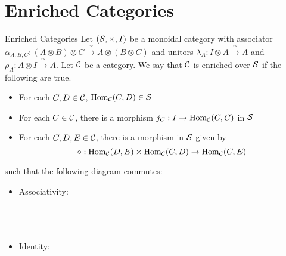 \documentclass[a4paper]{article}
\begin{document}
\section{Enriched Categories}
\begin{defn}{Enriched Categories}{} Let $(\mathcal{S},\times,I)$ be a monoidal category with associator $\alpha_{A,B,C}:(A\otimes B)\otimes C\overset{\cong}{\rightarrow}A\otimes (B\otimes C)$ and unitors $\lambda_A:I\otimes A\overset{\cong}{\rightarrow}A$ and $
\rho_A:A\otimes I\overset{\cong}{\rightarrow}A$. Let $\mathcal{C}$ be a category. We say that $\mathcal{C}$ is enriched over $\mathcal{S}$ if the following are true. 
\begin{itemize}
\item For each $C,D\in\mathcal{C}$, $\operatorname{Hom}_{\mathcal{C}}(C,D)\in\mathcal{S}$
\item For each $C\in\mathcal{C}$, there is a morphism $j_C:I\to\operatorname{Hom}_{\mathcal{C}}(C,C)$ in $\mathcal{S}$
\item For each $C,D,E\in\mathcal{C}$, there is a morphism in $\mathcal{S}$ given by $$\circ:\operatorname{Hom}_{\mathcal{C}}(D,E)\times\operatorname{Hom}_{\mathcal{C}}(C,D)\to\operatorname{Hom}_{\mathcal{C}}(C,E)$$
\end{itemize}
such that the following diagram commutes: 
\begin{itemize}
\item Associativity: \\~\\
\\~\\
\item Identity: \\~\\
\\~\\
\end{itemize}
\end{defn}
\end{document}

